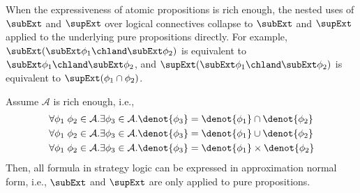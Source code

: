 When the expressiveness of atomic propositions is rich enough, the nested uses of $\subExt$ and $\supExt$ over logical connectives collapse to $\subExt$ and $\supExt$ applied to the underlying pure propositions directly. For example, $\subExt (\subExt \phi_1 \chland \subExt \phi_2)$ is equivalent to $\subExt \phi_1 \chland \subExt \phi_2$, and $\supExt (\subExt \phi_1 \chland \subExt \phi_2)$ is equivalent to $\supExt (\phi_1 \cap \phi_2)$.

\begin{theorem} Assume $\mathcal{A}$ is rich enough, i.e.,
\begin{align*}
  &\forall \phi_1\;\phi_2 \in \mathcal{A}. \exists \phi_3 \in \mathcal{A}. \denot{\phi_3} = \denot{\phi_1} \cap \denot{\phi_2}
  \\& \forall \phi_1\;\phi_2 \in \mathcal{A}. \exists \phi_3 \in \mathcal{A}. \denot{\phi_3} = \denot{\phi_1} \cup \denot{\phi_2}
  \\& \forall \phi_1\;\phi_2 \in \mathcal{A}. \exists \phi_3 \in \mathcal{A}. \denot{\phi_3} = \denot{\phi_1} \times \denot{\phi_2}
\end{align*}
Then, all formula in strategy logic can be expressed in approximation normal form, i.e., $\subExt$ and $\supExt$ are only applied to pure propositions.
\end{theorem}

